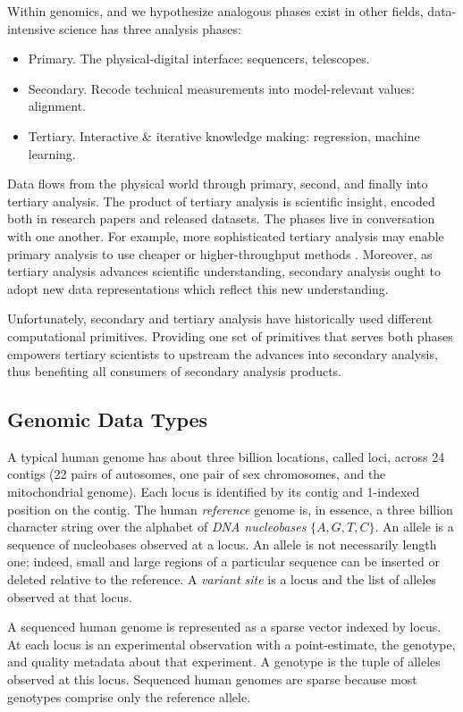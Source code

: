 \documentclass[sigconf, nonacm]{acmart}
\begin{document}
Within genomics, and we hypothesize analogous phases exist in other fields, data-intensive science
has three analysis phases:

\begin{itemize}
\item Primary. The physical-digital interface: sequencers, telescopes.
\item Secondary. Recode technical measurements into model-relevant values: alignment.
\item Tertiary. Interactive \& iterative knowledge making: regression, machine learning.
\end{itemize}

Data flows from the physical world through primary, second, and finally into tertiary analysis. The
product of tertiary analysis is scientific insight, encoded both in research papers and released
datasets. The phases live in conversation with one another. For example, more sophisticated tertiary
analysis may enable primary analysis to use cheaper or higher-throughput methods
\cite{bge}. Moreover, as tertiary analysis advances scientific understanding, secondary analysis
ought to adopt new data representations which reflect this new understanding.

Unfortunately, secondary and tertiary analysis have historically used different computational
primitives. Providing one set of primitives that serves both phases empowers tertiary scientists to
upstream the advances into secondary analysis, thus benefiting all consumers of secondary analysis
products.

\subsection{Genomic Data Types}

A typical human genome has about three billion locations, called loci, across 24 contigs (22 pairs
of autosomes, one pair of sex chromosomes, and the mitochondrial genome). Each locus is identified
by its contig and 1-indexed position on the contig. The human \emph{reference} genome is, in
essence, a three billion character string over the alphabet of \emph{DNA nucleobases} $\{A, G, T,
  C\}$. An allele is a sequence of nucleobases observed at a locus. An allele is not necessarily
length one; indeed, small and large regions of a particular sequence can be inserted or deleted
relative to the reference. A \emph{variant site} is a locus and the list of alleles observed at that
locus.

A sequenced human genome is represented as a sparse vector indexed by locus. At each locus is an
experimental observation with a point-estimate, the genotype, and quality metadata about that
experiment. A genotype is the tuple of alleles observed at this locus. Sequenced human genomes are
sparse because most genotypes comprise only the reference allele.
\end{document}
